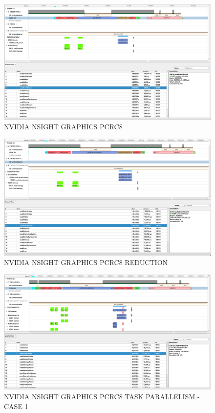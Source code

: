 \documentclass[fleqn]{IEEEtran}
\begin{document}
\begin{figure}[bt]
\centering
\includegraphics[width=\textwidth]{figures/NSG-PCRC8.png}
\caption{NVIDIA NSIGHT GRAPHICS PCRC8}
\label{fig:NSG-PCRC8}
\end{figure}

\begin{figure}[bt]
\centering
\includegraphics[width=\textwidth]{figures/NSG-PCRC8-reduction.png}
\caption{NVIDIA NSIGHT GRAPHICS PCRC8 REDUCTION}
\label{fig:NSG-PCRC8-reduction}
\end{figure}

\begin{figure}[bt]
\centering
\includegraphics[width=\textwidth]{figures/NSG-PCRC8-task-parallelism-1.png}
\caption{NVIDIA NSIGHT GRAPHICS PCRC8 TASK PARALLELISM - CASE 1}
\label{fig:NSG-PCRC8-task-parallelism-1}
\end{figure}
\end{document}
